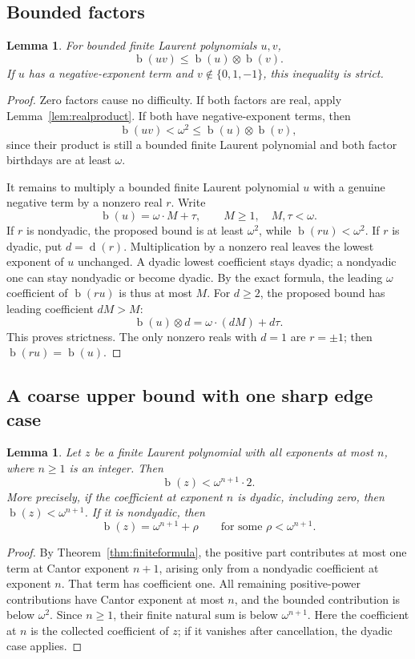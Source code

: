 \documentclass[11pt,letterpaper]{article}
\numberwithin{equation}{section}
\newtheorem{lemma}[theorem]{Lemma}
\theoremstyle{definition}
\theoremstyle{remark}
\newcommand{\bd}{\operatorname{b}}
\newcommand{\rd}{\operatorname{d}}
\newcommand{\np}{\mathbin{\otimes}}
\begin{document}
\subsection{Bounded factors}
\begin{lemma}\label{lem:bounded}
For bounded finite Laurent polynomials $u,v$,
\[
 \bd(uv)\leq\bd(u)\np\bd(v).
\]
If $u$ has a negative-exponent term and $v\notin\{0,1,-1\}$, this inequality
is strict.
\end{lemma}
\begin{proof}
Zero factors cause no difficulty. If both factors are real, apply
Lemma~\ref{lem:realproduct}. If both have negative-exponent terms, then
\[
 \bd(uv)<\omega^2\leq\bd(u)\np\bd(v),
\]
since their product is still a bounded finite Laurent polynomial and both
factor birthdays are at least $\omega$.

It remains to multiply a bounded finite Laurent polynomial $u$ with a genuine
negative term by a nonzero real $r$. Write
\[
 \bd(u)=\omega\cdot M+\tau,\qquad M\geq1,\quad M,\tau<\omega.
\]
If $r$ is nondyadic, the proposed bound is at least $\omega^2$, while
$\bd(ru)<\omega^2$. If $r$ is dyadic, put $d=\rd(r)$. Multiplication by a
nonzero real leaves the lowest exponent of $u$ unchanged. A dyadic lowest
coefficient stays dyadic; a nondyadic one can stay nondyadic or become dyadic.
By the exact formula, the leading $\omega$ coefficient of $\bd(ru)$ is thus at
most $M$. For $d\geq2$, the proposed bound has leading coefficient $dM>M$:
\[
 \bd(u)\np d=\omega\cdot(dM)+d\tau.
\]
This proves strictness. The only nonzero reals with $d=1$ are $r=\pm1$;
then $\bd(ru)=\bd(u)$.
\end{proof}

\subsection{A coarse upper bound with one sharp edge case}
\begin{lemma}\label{lem:degree}
Let $z$ be a finite Laurent polynomial with all exponents at most $n$, where
$n\geq1$ is an integer. Then
\[
 \bd(z)<\omega^{n+1}\cdot2.
\]
More precisely, if the coefficient at exponent $n$ is dyadic, including zero,
then $\bd(z)<\omega^{n+1}$. If it is nondyadic, then
\[
 \bd(z)=\omega^{n+1}+\rho
 \qquad\text{for some }\rho<\omega^{n+1}.
\]
\end{lemma}
\begin{proof}
By Theorem~\ref{thm:finiteformula}, the positive part contributes at most one
term at Cantor exponent $n+1$, arising only from a nondyadic coefficient at
exponent $n$. That term has coefficient one. All remaining positive-power
contributions have Cantor exponent at most $n$, and the bounded contribution
is below $\omega^2$. Since $n\geq1$, their finite natural sum is below
$\omega^{n+1}$. Here the coefficient at $n$ is the collected coefficient
of $z$; if it vanishes after cancellation, the dyadic case applies.
\end{proof}
\end{document}
